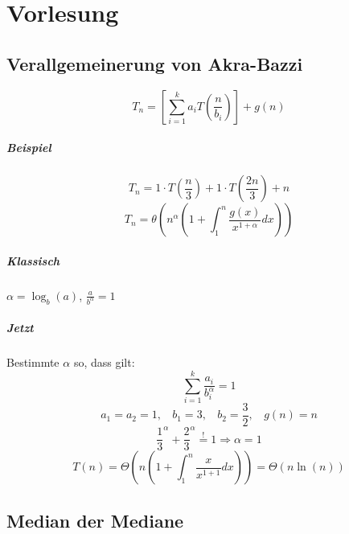 \chapter{Vorlesung}


\section{Verallgemeinerung von Akra-Bazzi}

\[T_n = \left[\sum_{i=1}^k a_i T(\frac{n}{b_i}) \right] + g(n) \]
\paragraph{Beispiel}
\[T_n = 1\cdot T\left(\frac{n}{3}\right)+1\cdot T\left(\frac{2n}{3}\right) + n \]
\[T_n = \theta\left(n^{\alpha}\left(1+\int_1^n\frac{g\left(x\right)}{x^{1+\alpha}} dx\right)\right)  \]


\paragraph{Klassisch} $\alpha = \log_b(a)$, $\frac{a}{b^{\alpha}} = 1$
\paragraph{Jetzt} Bestimmte $\alpha$ so, dass gilt:
\[\sum_{i=1}^k \frac{a_i}{b_i^{\alpha}} = 1 \]
\[a_1 = a_2 = 1, ~~~~ b_1 = 3, ~~~~ b_2 = \frac{3}{2}, ~~~~ g(n) = n \]
 \[\frac{1}{3}^{\alpha} + \frac{2}{3}^{\alpha} \overset{!}{=} 1 \Rightarrow \alpha = 1 \]
\[T(n) = \Theta \left(n \left(1+\int_1^n \frac{x}{x^{1+1}} dx\right) \right) = \Theta(n\ln(n)) \]


\section{Median der Mediane}


